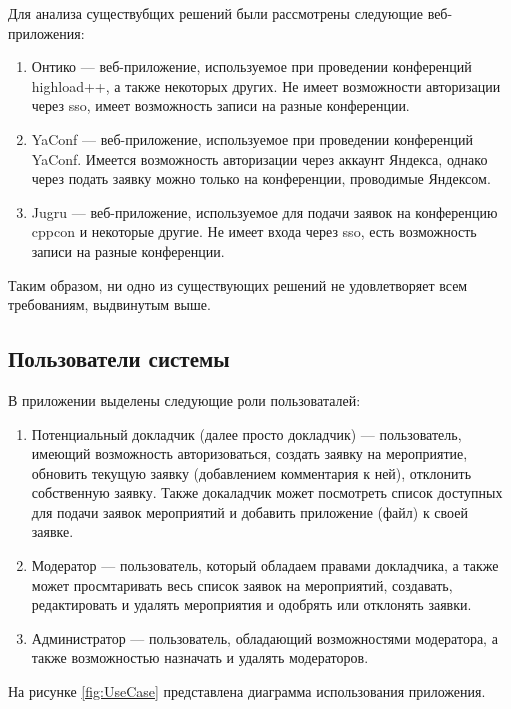 Для анализа существубщих решений были рассмотрены следующие веб-приложения:
\begin{enumerate}
	\item Онтико\cite{ontico} --- веб-приложение, используемое при проведении конференций highload++, а также некоторых других. Не имеет возможности авторизации через sso, имеет возможность записи на разные конференции.
	\item YaConf\cite{yaconf} --- веб-приложение, используемое при проведении конференций YaConf. Имеется возможность авторизации через аккаунт Яндекса, однако через подать заявку можно только на конференции, проводимые Яндексом.
	\item Jugru\cite{jugru} --- веб-приложение, используемое для подачи заявок на конференцию cppcon и некоторые другие. Не имеет входа через sso, есть возможность записи на разные конференции.
\end{enumerate}

Таким образом, ни одно из существующих решений не удовлетворяет всем требованиям, выдвинутым выше.

\subsection{Пользователи системы}

В приложении выделены следующие роли пользоваталей:
\begin{enumerate}
	\item Потенциальный докладчик (далее просто докладчик) --- пользователь, имеющий возможность авторизоваться, создать заявку на мероприятие, обновить текущую заявку (добавлением комментария к ней), отклонить собственную заявку. Также докаладчик может посмотреть список доступных для подачи заявок мероприятий и добавить приложение (файл) к своей заявке.
	\item Модератор --- пользователь, который обладаем правами докладчика, а также может просмтаривать весь список заявок на мероприятий, создавать, редактировать и удалять мероприятия и одобрять или отклонять заявки.
	\item Администратор --- пользователь, обладающий возможностями модератора, а также возможностью назначать и удалять модераторов.
\end{enumerate}

На рисунке \ref{fig:UseCase} представлена диаграмма использования приложения.

